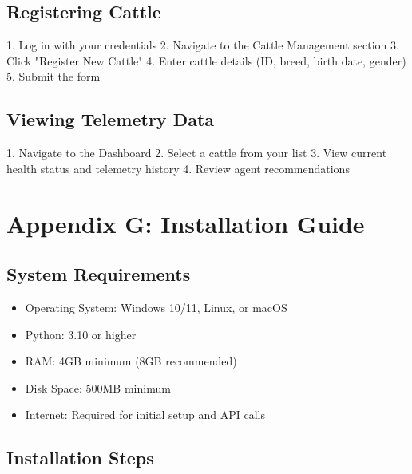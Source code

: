\subsection*{Registering Cattle}

1. Log in with your credentials
2. Navigate to the Cattle Management section
3. Click "Register New Cattle"
4. Enter cattle details (ID, breed, birth date, gender)
5. Submit the form

\subsection*{Viewing Telemetry Data}

1. Navigate to the Dashboard
2. Select a cattle from your list
3. View current health status and telemetry history
4. Review agent recommendations

\section*{Appendix G: Installation Guide}

\subsection*{System Requirements}

\begin{itemize}
    \item Operating System: Windows 10/11, Linux, or macOS
    \item Python: 3.10 or higher
    \item RAM: 4GB minimum (8GB recommended)
    \item Disk Space: 500MB minimum
    \item Internet: Required for initial setup and API calls
\end{itemize}

\subsection*{Installation Steps}

